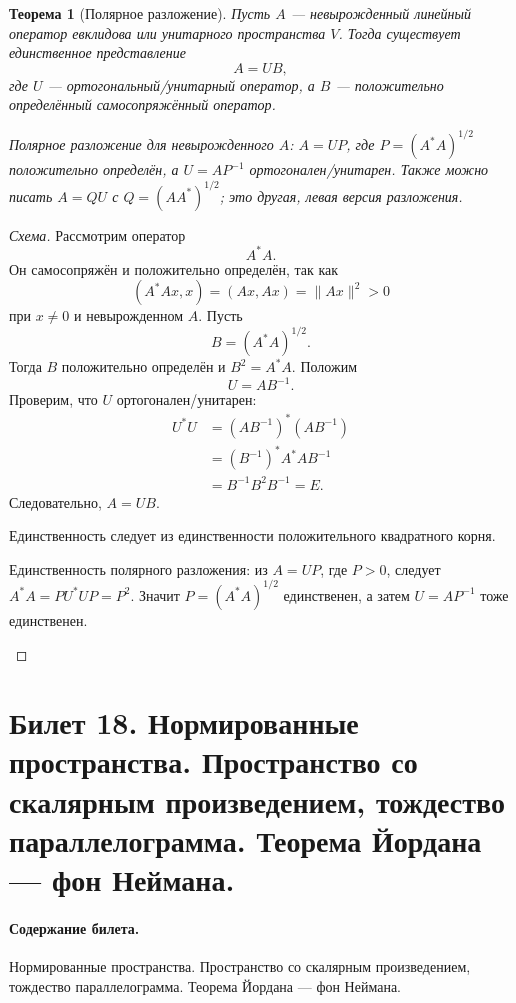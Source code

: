 \documentclass[12pt,a4paper]{article}
\theoremstyle{definition}
\theoremstyle{plain}
\newtheorem{theorem}[definition]{Теорема}
\theoremstyle{remark}
\newenvironment{knowledgefix}{\begin{clarifybox}}{\end{clarifybox}}
\begin{document}
\begin{theorem}[Полярное разложение]
Пусть $A$ --- невырожденный линейный оператор евклидова или унитарного пространства $V$.
Тогда существует единственное представление
\[
    A=UB,
\]
где $U$ --- ортогональный/унитарный оператор, а $B$ --- положительно определённый самосопряжённый оператор.
\begin{knowledgefix}
Полярное разложение для невырожденного \(A\): \(A=UP\), где \(P=(A^*A)^{1/2}\) положительно определён, а \(U=AP^{-1}\) ортогонален/унитарен. Также можно писать \(A=Q U\) с \(Q=(AA^*)^{1/2}\); это другая, левая версия разложения.
\end{knowledgefix}
\end{theorem}

\begin{proof}[Схема]
Рассмотрим оператор
\[
    A^*A.
\]
Он самосопряжён и положительно определён, так как
\[
    (A^*Ax,x)=(Ax,Ax)=\|Ax\|^2>0
\]
при $x\ne0$ и невырожденном $A$.
Пусть
\[
    B=(A^*A)^{1/2}.
\]
Тогда $B$ положительно определён и $B^2=A^*A$.
Положим
\[
    U=AB^{-1}.
\]
Проверим, что $U$ ортогонален/унитарен:
\[
\begin{aligned}
    U^*U
    &=(AB^{-1})^*(AB^{-1})\\
    &=(B^{-1})^*A^*AB^{-1}\\
    &=B^{-1}B^2B^{-1}=E.
\end{aligned}
\]
Следовательно, $A=UB$.

Единственность следует из единственности положительного квадратного корня.
\begin{knowledgefix}
Единственность полярного разложения: из \(A=UP\), где \(P>0\), следует \(A^*A=P U^* U P=P^2\). Значит \(P=(A^*A)^{1/2}\) единственен, а затем \(U=AP^{-1}\) тоже единственен.
\end{knowledgefix}
\end{proof}

\clearpage

\section{Билет 18. Нормированные пространства. Пространство со скалярным произведением, тождество параллелограмма. Теорема Йордана — фон Неймана.}

\paragraph{Содержание билета.} Нормированные пространства. Пространство со скалярным произведением, тождество параллелограмма. Теорема Йордана — фон Неймана.
\end{document}
